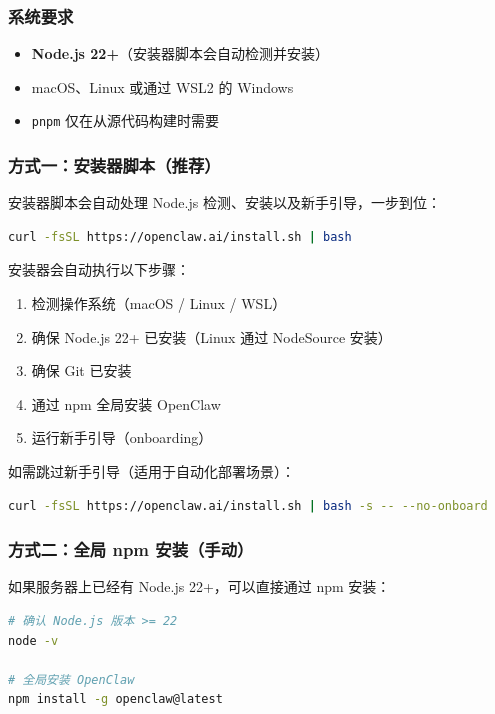 \subsubsection{系统要求}

\begin{itemize}
  \item \textbf{Node.js 22+}（安装器脚本会自动检测并安装）
  \item macOS、Linux 或通过 WSL2 的 Windows
  \item \texttt{pnpm} 仅在从源代码构建时需要
\end{itemize}

\subsubsection{方式一：安装器脚本（推荐）}

安装器脚本会自动处理 Node.js 检测、安装以及新手引导，一步到位：

\begin{lstlisting}[language=bash]
curl -fsSL https://openclaw.ai/install.sh | bash
\end{lstlisting}

安装器会自动执行以下步骤：
\begin{enumerate}
  \item 检测操作系统（macOS / Linux / WSL）
  \item 确保 Node.js 22+ 已安装（Linux 通过 NodeSource 安装）
  \item 确保 Git 已安装
  \item 通过 npm 全局安装 OpenClaw
  \item 运行新手引导（onboarding）
\end{enumerate}

如需跳过新手引导（适用于自动化部署场景）：

\begin{lstlisting}[language=bash]
curl -fsSL https://openclaw.ai/install.sh | bash -s -- --no-onboard
\end{lstlisting}

\subsubsection{方式二：全局 npm 安装（手动）}

如果服务器上已经有 Node.js 22+，可以直接通过 npm 安装：

\begin{lstlisting}[language=bash]
# 确认 Node.js 版本 >= 22
node -v

# 全局安装 OpenClaw
npm install -g openclaw@latest
\end{lstlisting}

